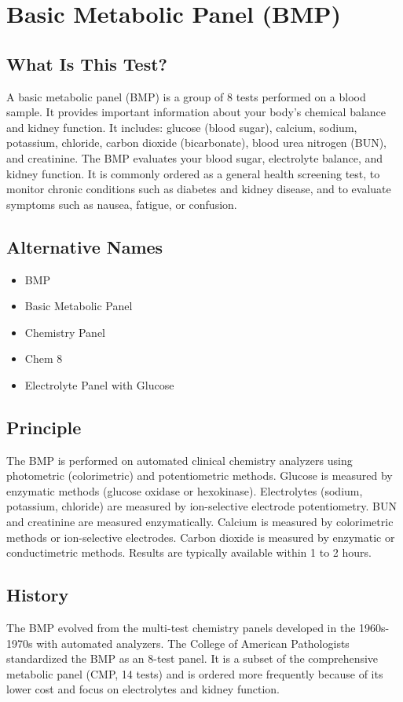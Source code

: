 \chapter{Basic Metabolic Panel (BMP)}

\section*{What Is This Test?}
A basic metabolic panel (BMP) is a group of 8 tests performed on a blood sample. It provides important information about your body's chemical balance and kidney function. It includes: glucose (blood sugar), calcium, sodium, potassium, chloride, carbon dioxide (bicarbonate), blood urea nitrogen (BUN), and creatinine. The BMP evaluates your blood sugar, electrolyte balance, and kidney function. It is commonly ordered as a general health screening test, to monitor chronic conditions such as diabetes and kidney disease, and to evaluate symptoms such as nausea, fatigue, or confusion.

\section*{Alternative Names}
\begin{itemize}
  \item BMP
  \item Basic Metabolic Panel
  \item Chemistry Panel
  \item Chem 8
  \item Electrolyte Panel with Glucose
\end{itemize}
\section*{Principle}
The BMP is performed on automated clinical chemistry analyzers using photometric (colorimetric) and potentiometric methods. Glucose is measured by enzymatic methods (glucose oxidase or hexokinase). Electrolytes (sodium, potassium, chloride) are measured by ion-selective electrode potentiometry. BUN and creatinine are measured enzymatically. Calcium is measured by colorimetric methods or ion-selective electrodes. Carbon dioxide is measured by enzymatic or conductimetric methods. Results are typically available within 1 to 2 hours.

\section*{History}
The BMP evolved from the multi-test chemistry panels developed in the 1960s-1970s with automated analyzers. The College of American Pathologists standardized the BMP as an 8-test panel. It is a subset of the comprehensive metabolic panel (CMP, 14 tests) and is ordered more frequently because of its lower cost and focus on electrolytes and kidney function.

